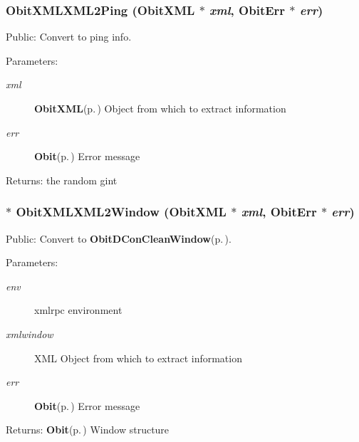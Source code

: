 \subsubsection{ Obit\-XMLXML2Ping ({\bf Obit\-XML} $\ast$ {\em xml}, {\bf Obit\-Err} $\ast$ {\em err})}\label{ObitXML_8h_a22}


Public: Convert to ping info. 

\begin{Desc}
\item[Parameters:]
\begin{description}
\item[{\em xml}]{\bf Obit\-XML}{\rm (p.\,\pageref{structObitXML})} Object from which to extract information \item[{\em err}]{\bf Obit}{\rm (p.\,\pageref{structObit})} Error message \end{description}
\end{Desc}
\begin{Desc}
\item[Returns:]the random gint \end{Desc}
\subsubsection{$\ast$ Obit\-XMLXML2Window ({\bf Obit\-XML} $\ast$ {\em xml}, {\bf Obit\-Err} $\ast$ {\em err})}\label{ObitXML_8h_a29}


Public: Convert to {\bf Obit\-DCon\-Clean\-Window}{\rm (p.\,\pageref{structObitDConCleanWindow})}. 

\begin{Desc}
\item[Parameters:]
\begin{description}
\item[{\em env}]xmlrpc environment \item[{\em xmlwindow}]XML Object from which to extract information \item[{\em err}]{\bf Obit}{\rm (p.\,\pageref{structObit})} Error message \end{description}
\end{Desc}
\begin{Desc}
\item[Returns:]{\bf Obit}{\rm (p.\,\pageref{structObit})} Window structure \end{Desc}
